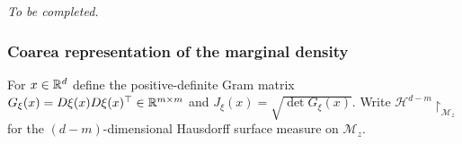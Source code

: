 \documentclass[12pt,a4paper,oneside]{book}
\begin{document}

\noindent\textit{To be completed.}



\subsubsection{Coarea representation of the marginal density}
For $x\in\mathbb{R}^d$ define the positive-definite Gram matrix
$G_\xi(x)=D\xi(x)D\xi(x)^\top\in\mathbb{R}^{m\times m}$ and
$J_\xi(x)=\sqrt{\det G_\xi(x)}$. Write
$\mathcal H^{d-m}\!\restriction_{\mathcal M_z}$ for the $(d-m)$-dimensional
Hausdorff surface measure on $\mathcal M_z$.
\end{document}

